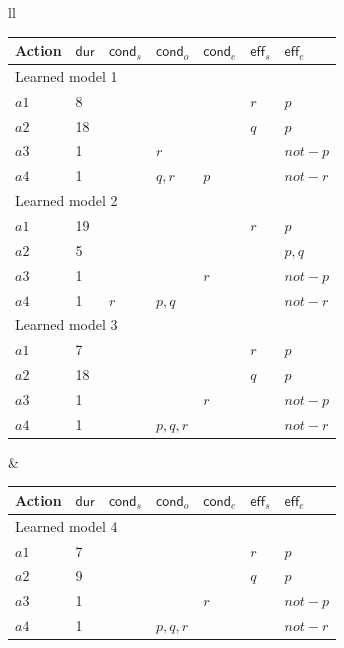 \documentclass[10pt,journal,compsoc]{IEEEtran}
\newcommand{\eff}{\mathsf{eff}}    %
\newcommand{\cond}{\mathsf{cond}}  %
\newcommand{\dur}{\mathsf{dur}}    %
\begin{document}
\begin{figure}
	\center
	{\footnotesize 
	\begin{tabular}{ll}
		\hspace{-0.6cm}\begin{tabular}{lllllll}
			Action & $\dur$ & $\cond_s$ & $\cond_o$ & $\cond_e$ & $\eff_s$ & $\eff_e$ \\
			
			\hline
			
			\multicolumn{7}{l}{Learned model 1} \\
			$a1$ & 8 & & & & $r$ & $p$ \\
			$a2$ & 18 & & & & $q$ & $p$ \\
			$a3$ & 1 & & $r$ & & & $not-p$ \\
			$a4$ & 1 & & $q,r$ & $p$ & & $not-r$ \\
			
			\hline
			
			\multicolumn{7}{l}{Learned model 2} \\
			$a1$ & 19 & & & & $r$ & $p$ \\
			$a2$ & 5 & & & & & $p,q$ \\
			$a3$ & 1 & & & $r$ & & $not-p$ \\
			$a4$ & 1 & $r$ & $p,q$ & & & $not-r$ \\
			
			\hline
			
			\multicolumn{7}{l}{Learned model 3} \\
			$a1$ & 7 & & & & $r$ & $p$ \\
			$a2$ & 18 & & & & $q$ & $p$ \\
			$a3$ & 1 & & & $r$  & & $not-p$ \\
			$a4$ & 1 & & $p,q,r$ & & & $not-r$ \\
		\end{tabular} &
		
		\hspace{0.3cm}\begin{tabular}{lllllll}
			
			Action & $\dur$ & $\cond_s$ & $\cond_o$ & $\cond_e$ & $\eff_s$ & $\eff_e$ \\
			
			\hline
			
			\multicolumn{7}{l}{Learned model 4} \\
			$a1$ & 7 & & & & $r$ & $p$ \\
			$a2$ & 9 & & & & $q$ & $p$ \\
			$a3$ & 1 & & & $r$ & & $not-p$ \\
			$a4$ & 1 & & $p,q,r$ & & & $not-r$ \\
			

\end{tabular}
\end{tabular}}
\end{figure}
\end{document}
